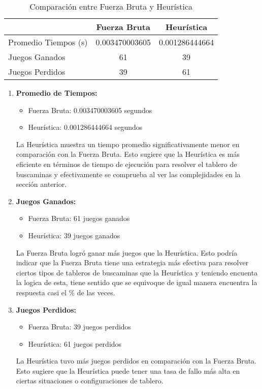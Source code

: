 \documentclass{article}
\begin{document}
\begin{table}[htbp]
\centering
\caption{Comparación entre Fuerza Bruta y Heurística}
\begin{tabular}{|l|c|c|}
\hline
\textbf{} & \textbf{Fuerza Bruta} & \textbf{Heurística} \\ \hline
Promedio Tiempos (s) & 0.003470003605 & 0.001286444664 \\ \hline
Juegos Ganados & 61 & 39 \\ \hline
Juegos Perdidos & 39 & 61 \\ \hline
\end{tabular}
\end{table}

\begin{enumerate}
    \item \textbf{Promedio de Tiempos:}
    
    \begin{itemize}
        \item Fuerza Bruta: 0.003470003605 segundos
        \item Heurística: 0.001286444664 segundos
    \end{itemize}
    
    La Heurística muestra un tiempo promedio significativamente menor en comparación con la Fuerza Bruta. Esto sugiere que la Heurística es más eficiente en términos de tiempo de ejecución para resolver el tablero de buscaminas y efectivamente se comprueba al ver las complejidades en la sección anterior.
    
    \item \textbf{Juegos Ganados:}
    
    \begin{itemize}
        \item Fuerza Bruta: 61 juegos ganados
        \item Heurística: 39 juegos ganados
    \end{itemize}
    
    La Fuerza Bruta logró ganar más juegos que la Heurística. Esto podría indicar que la Fuerza Bruta tiene una estrategia más efectiva para resolver ciertos tipos de tableros de buscaminas que la Heurística y teniendo encuenta la logica de esta, tiene sentido que se equivoque de igual manera encuentra la respuesta casi el \% de las veces.
    
    \item \textbf{Juegos Perdidos:}
    
    \begin{itemize}
        \item Fuerza Bruta: 39 juegos perdidos
        \item Heurística: 61 juegos perdidos
    \end{itemize}
    
    La Heurística tuvo más juegos perdidos en comparación con la Fuerza Bruta. Esto sugiere que la Heurística puede tener una tasa de fallo más alta en ciertas situaciones o configuraciones de tablero.
\end{enumerate}
\end{document}
